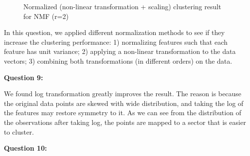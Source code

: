 \documentclass[runningheads]{llncs}
\begin{document}
\begin{figure}
\centering
{}
\caption{Normalized (non-linear transformation + scaling) clustering result for NMF (r=2)} \label{Q8_NMF_nonlinear_scale}
\end{figure}

In this question, we applied different normalization methods to see if they increase the clustering performance: 1) normalizing features such that each feature has unit variance; 2) applying a non-linear transformation to the data vectors; 3) combining both transformations (in different orders) on the data. 

\bigbreak

\textbf{Question 9:}

We found log transformation greatly improves the result. The reason is because the original data points are skewed with wide distribution, and taking the log of the features may restore symmetry to it. As we can see from the distribution of the observations after taking log, the points are mapped to a sector that is easier to cluster.

\textbf{Question 10:}

\begin{table}[h]
\center
\caption{Performance for SVD after normalization (scaling) (r=2)}
\label{tab:Q7_SVD_1}
\end{table}
\end{document}
